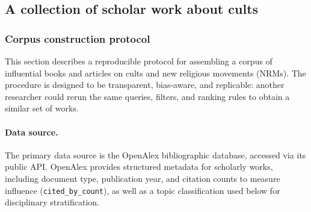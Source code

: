 \subsection{A collection of scholar work about cults}
\subsubsection{Corpus construction protocol}\label{sec:corpus_construction_protocol}
This section describes a reproducible protocol for assembling a corpus of influential books and articles on cults and new religious movements (NRMs). The procedure is designed to be transparent, bias-aware, and replicable: another researcher could rerun the same queries, filters, and ranking rules to obtain a similar set of works.

\paragraph{Data source.} The primary data source is the OpenAlex \autocite{priemOpenAlexFullyopenIndex2022} bibliographic database, accessed via its public API. OpenAlex provides structured metadata for scholarly works, including document type, publication year, and citation counts to measure influence (\verb+cited_by_count+), as well as a topic classification used below for disciplinary stratification.

